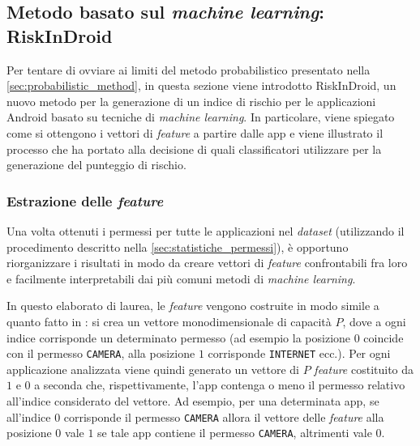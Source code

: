 \documentclass[12pt,a4paper,oneside]{article}
\begin{document}
\subsection{Metodo basato sul \textit{machine learning}: RiskInDroid}\label{sec:machine_learn_method}

Per tentare di ovviare ai limiti del metodo probabilistico presentato nella \cref{sec:probabilistic_method}, in questa sezione viene introdotto RiskInDroid, un nuovo metodo per la generazione di un indice di rischio per le applicazioni Android basato su tecniche di \textit{machine learning}. In particolare, viene spiegato come si ottengono i vettori di \textit{feature} a partire dalle app e viene illustrato il processo che ha portato alla decisione di quali classificatori utilizzare per la generazione del punteggio di rischio.

\subsubsection{Estrazione delle \textit{feature}}\label{sec:feature_extraction}

Una volta ottenuti i permessi per tutte le applicazioni nel \textit{dataset} (utilizzando il procedimento descritto nella \cref{sec:statistiche_permessi}), è opportuno riorganizzare i risultati in modo da creare vettori di \textit{feature} confrontabili fra loro e facilmente interpretabili dai più comuni metodi di \textit{machine learning}.

In questo elaborato di laurea, le \textit{feature} vengono costruite in modo simile a quanto fatto in \cite{PERMISSION_FEATURES}: si crea un vettore monodimensionale di capacità $P$, dove a ogni indice corrisponde un determinato permesso (ad esempio la posizione $0$ coincide con il permesso \texttt{CAMERA}, alla posizione $1$ corrisponde \texttt{INTERNET} ecc.). Per ogni applicazione analizzata viene quindi generato un vettore di $P$ \textit{feature} costituito da $1$ e $0$ a seconda che, rispettivamente, l'app contenga o meno il permesso relativo all'indice considerato del vettore. Ad esempio, per una determinata app, se all'indice $0$ corrisponde il permesso \texttt{CAMERA} allora il vettore delle \textit{feature} alla posizione $0$ vale $1$ se tale app contiene il permesso \texttt{CAMERA}, altrimenti vale $0$.
\end{document}

